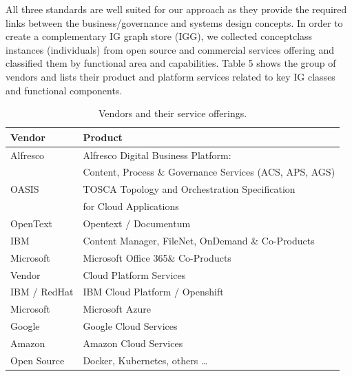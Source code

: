 \documentclass[a4paper,twoside]{article}
\begin{document}
%
All three standards are well suited for our approach as they provide the required links between the business/governance and systems design concepts. In order to create a complementary IG graph store (IGG), we collected concept\/class instances (individuals) from open source and commercial services offering and classified them by functional area and capabilities. Table 5 shows the group of vendors and lists their product and platform services related to key IG classes and functional components.
\begin{table}[ht]
\caption{Vendors and their service offerings.}
\label{tab:vendors} \centering
 \scalebox{0.55} {\begin{tabular}{|l|l|}
 \hline
  {Vendor} & {Product}\\
  \hline
  {Alfresco} & {Alfresco Digital Business Platform: \cite{Alfresco}}\\
  { } & {Content, Process \& Governance Services (ACS, APS, AGS)}\\
  \hline
  {OASIS} & {TOSCA Topology and Orchestration Specification } \\
  {} & { for Cloud Applications \cite{TOSCA2022}} \\  
  \hline 
  {OpenText} & {Opentext / Documentum}\\
  \hline
  {IBM} & {Content Manager, FileNet, OnDemand \& Co-Products}\\
  \hline
  {Microsoft} & {Microsoft Office 365\& Co-Products \cite{Microsoft}}\\
  \hline
  \hline
  {Vendor	} & {Cloud Platform Services}\\
  \hline
  {IBM / RedHat} & {IBM Cloud Platform / Openshift}\\
  \hline
  {Microsoft} & {Microsoft Azure}\\
  \hline
  {Google} & {Google Cloud Services}\\
  \hline
  {Amazon} & {Amazon Cloud Services}\\
  \hline
  {Open Source} &	{Docker, Kubernetes, others … }\\
  \hline
 \end{tabular}}
\end{table}
%
\end{document}
